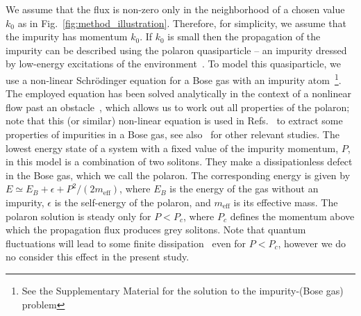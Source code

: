 \documentclass[twocolumn,amsmath,amssymb,showpacs,prl,superscriptaddress,aps]{revtex4-1}
\begin{document}
We assume that the flux is non-zero only 
in the neighborhood of a chosen value $k_0$ as in Fig.~\ref{fig:method_illustration}.
Therefore, for simplicity, we assume that the impurity has momentum $k_0$.
If $k_0$ is small then the propagation of the impurity can be described using the polaron quasiparticle 
-- an impurity dressed by low-energy excitations of the environment~\cite{landau1948}. 
To model this quasiparticle, we use a non-linear Schr{\"o}dinger equation
for a Bose gas with an impurity atom~\footnote{See the Supplementary Material for the solution to 
the impurity-(Bose gas) problem}. The employed equation has been solved analytically
in the context of a nonlinear flow past an obstacle~\cite{hakim1997}, 
which allows us to work out all properties of the polaron; 
note that this (or similar) non-linear equation is used in Refs.~\cite{kamenev2016, volosniev2017, mistakidis2018, dehkharghani2018, pastukhov2018}
to extract some properties of impurities in a Bose gas,
see also~\cite{kain2016, parisi2017,grusdt2017, pastukhov2017, kain2018} for other relevant studies. 
The lowest energy state of a system with a fixed value of the impurity momentum, $P$, in this model
is a combination of two solitons. They make a dissipationless defect in the Bose gas, which we call the polaron. The corresponding energy 
is given by $E\simeq E_B+\epsilon+P^2/(2m_{\mathrm{eff}})$, where $E_B$ is the energy of the gas without an impurity, 
$\epsilon$ is the self-energy of the polaron, and $m_{\mathrm{eff}}$ is its effective mass. The polaron solution is steady only 
for $P<P_c$, where $P_c$ defines the momentum above which the propagation flux produces grey solitons. 
Note that quantum fluctuations will lead to some finite dissipation~\cite{astrakharchik2004,sykes2009,Cherny2012} even for $P<P_c$, however
we do no consider this effect in the present study.
\end{document}

